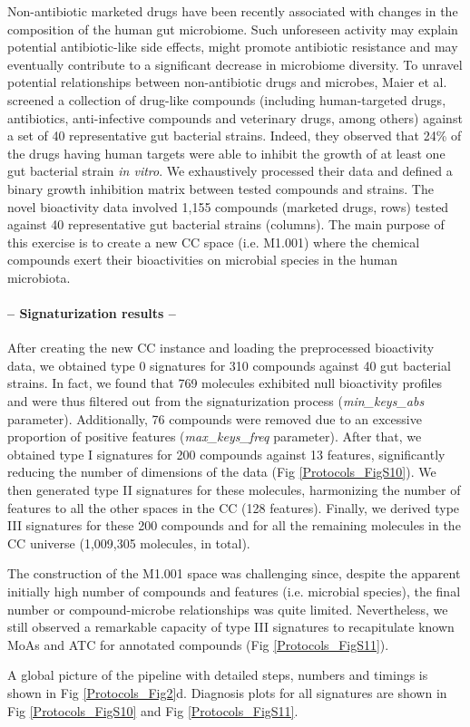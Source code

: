 Non-antibiotic marketed drugs have been recently associated with changes in the composition of the human gut microbiome\cite{weersma_interaction_2020}. Such unforeseen activity may explain potential antibiotic-like side effects, might promote antibiotic resistance and may eventually contribute to a significant decrease in microbiome diversity\cite{maier_extensive_2018}. To unravel potential relationships between non-antibiotic drugs and microbes, Maier et al.\cite{maier_extensive_2018} screened a collection of drug-like compounds (including human-targeted drugs, antibiotics, anti-infective compounds and veterinary drugs, among others) against a set of 40 representative gut bacterial strains. Indeed, they observed that 24\% of the drugs having human targets were able to inhibit the growth of at least one gut bacterial strain \textit{in vitro}. We exhaustively processed their data and defined a binary growth inhibition matrix between tested compounds and strains. The novel bioactivity data involved 1,155 compounds (marketed drugs, rows) tested against 40 representative gut bacterial strains (columns). The main purpose of this exercise is to create a new CC space (i.e. M1.001) where the chemical compounds exert their bioactivities on microbial species in the human microbiota.

\paragraph{-- Signaturization results --}  \leavevmode

After creating the new CC instance and loading the preprocessed bioactivity data, we obtained type 0 signatures for 310 compounds against 40 gut bacterial strains. In fact, we found that 769 molecules exhibited null bioactivity profiles and were thus filtered out from the signaturization process (\textit{min\_keys\_abs} parameter). Additionally, 76 compounds were removed due to an excessive proportion of positive features (\textit{max\_keys\_freq} parameter). After that, we obtained type I signatures for 200 compounds against 13 features, significantly reducing the number of dimensions of the data (Fig \ref{Protocols_FigS10}). We then generated type II signatures for these molecules, harmonizing the number of features to all the other spaces in the CC (128 features). Finally, we derived type III signatures for these 200 compounds and for all the remaining molecules in the CC universe (1,009,305 molecules, in total). 

The construction of the M1.001 space was challenging since, despite the apparent initially high number of compounds and features (i.e. microbial species), the final number or compound-microbe relationships was quite limited. Nevertheless, we still observed a remarkable capacity of type III signatures to recapitulate known MoAs and ATC for annotated compounds (Fig \ref{Protocols_FigS11}).

A global picture of the pipeline with detailed steps, numbers and timings is shown in Fig \ref{Protocols_Fig2}d. Diagnosis plots for all signatures are shown in Fig \ref{Protocols_FigS10} and Fig \ref{Protocols_FigS11}.

